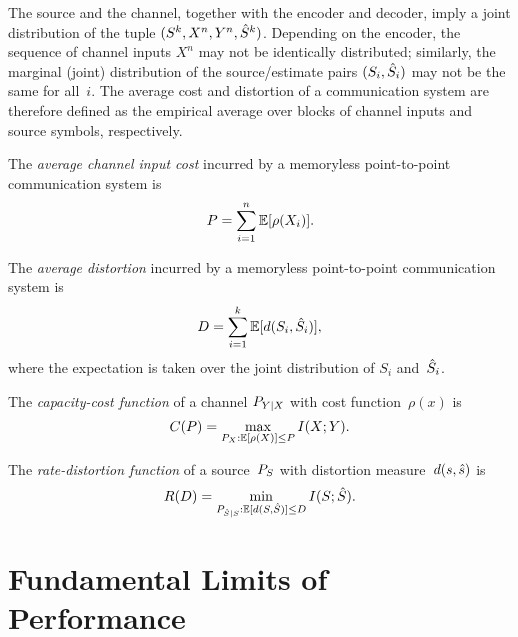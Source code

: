 The source and the channel, together with the encoder and decoder, imply a joint
distribution of the tuple $(S^k, X^n, Y^n, {\hat{S}}^k)$.  Depending on the encoder,
the sequence of channel inputs $X^n$ may not be identically distributed;
similarly, the marginal (joint) distribution of the source/estimate pairs
$(S_i,{\hat{S}}_i)$ may not be the same for all~$i$. The average cost and distortion
of a communication system are therefore defined as the empirical average over
blocks of channel inputs and source symbols, respectively.

\begin{definition}
  \label{def:avgcost}
  The \emph{average channel input cost} incurred by a memoryless point-to-point
  communication system is
  \begin{equation*}
    P = \sum_{i=1}^n \mathbb{E}[\rho(X_i)].
  \end{equation*}
\end{definition}

\begin{definition}
  \label{def:avgdist}
  The \emph{average distortion} incurred by a memoryless point-to-point
  communication system is
  \begin{equation*}
    D = \sum_{i=1}^k \mathbb{E}[d(S_i, {\hat{S}}_i)],
  \end{equation*}
  where the expectation is taken over the joint distribution of $S_i$
  and~${\hat{S}}_i$.
\end{definition}

\begin{definition}
  \label{def:capacity}
  The \emph{capacity-cost function} of a channel $P_{Y|X}$ with cost
  function~$\rho(x)$ is
  \begin{equation*}
    C(P) = \max_{P_X: \mathbb{E}[\rho(X)] \le P} I(X;Y).
  \end{equation*}
\end{definition}

\begin{definition}
  \label{def:ratedistortion}
  The \emph{rate-distortion function} of a source~${P_S}$ with distortion
  measure~$d(s,{\hat{s}})$ is 
  \begin{equation*}
    R(D) = \min_{P_{{\hat{S}}|S}: \mathbb{E}[d(S,{\hat{S}})] \le D} I(S;{\hat{S}}).
  \end{equation*}
\end{definition}


\section{Fundamental Limits of Performance}\label{sec:fundamentallimits}

